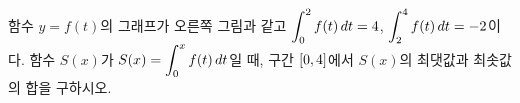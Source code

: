 \noindent\begin{minipage}[t]{0.58\linewidth}\vspace{0pt}\raggedright 함수 $y=f(t)$의 그래프가 오른쪽 그림과 같고 $\displaystyle\int_{0}^{2} f(t)\mkern3mu dt=4$, $\displaystyle\int_{2}^{4} f(t)\mkern3mu dt=-2$이다. 함수 $S(x)$가 $S(x)=\displaystyle\int_{0}^{x} f(t)\mkern3mu dt$일 때, 구간 $[0{,}\mkern3mu\mathopen{}4]$에서 $S(x)$의 최댓값과 최솟값의 합을 구하시오.\end{minipage}\hfill\begin{minipage}[t]{0.4\linewidth}\vspace{0pt}\centering \resizebox{\ifdim\width>\linewidth\linewidth\else\width\fi}{!}{}\end{minipage}\par
